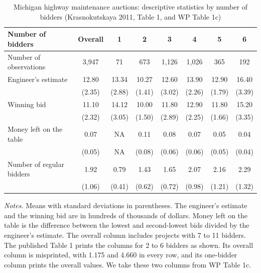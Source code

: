 \begin{table}[htbp]
\centering
\caption{Michigan highway maintenance auctions: descriptive statistics by number of bidders
(Krasnokutskaya 2011, Table 1, and WP Table 1c)}
\label{tab:15-krasno-desc}
\begin{tabular}{lccccccc}
\toprule
Number of bidders & Overall & 1 & 2 & 3 & 4 & 5 & 6\\
\midrule
Number of observations & 3,947 & 71 & 673 & 1,126 & 1,026 & 365 & 192\\
\addlinespace
Engineer's estimate & 12.80 & 13.34 & 10.27 & 12.60 & 13.90 & 12.90 & 16.40\\
 & (2.35) & (2.88) & (1.41) & (3.02) & (2.26) & (1.79) & (3.39)\\
Winning bid & 11.10 & 14.12 & 10.00 & 11.80 & 12.90 & 11.80 & 15.20\\
 & (2.32) & (3.05) & (1.50) & (2.89) & (2.25) & (1.66) & (3.35)\\
Money left on the table & 0.07 & NA & 0.11 & 0.08 & 0.07 & 0.05 & 0.04\\
 & (0.05) & NA & (0.08) & (0.06) & (0.06) & (0.05) & (0.04)\\
Number of regular bidders & 1.92 & 0.79 & 1.43 & 1.65 & 2.07 & 2.16 & 2.29\\
 & (1.06) & (0.41) & (0.62) & (0.72) & (0.98) & (1.21) & (1.32)\\
\bottomrule
\end{tabular}

\smallskip
\begin{minipage}{0.93\textwidth}
\footnotesize \textit{Notes.} Means with standard deviations in parentheses. The engineer's estimate and the
winning bid are in hundreds of thousands of dollars. Money left on the table is the difference
between the lowest and second-lowest bids divided by the engineer's estimate. The overall column
includes projects with 7 to 11 bidders. The published Table 1 prints the columns for 2 to 6 bidders as
shown. Its overall column is misprinted, with 1.175 and 4.660 in every row, and its one-bidder column
prints the overall values. We take these two columns from WP Table 1c.
\end{minipage}
\end{table}

